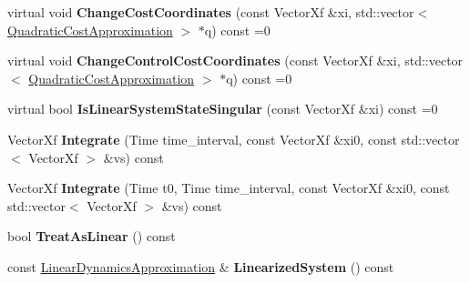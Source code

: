 \begin{DoxyCompactItemize}
\item 
virtual void {\bfseries Change\+Cost\+Coordinates} (const Vector\+Xf \&xi, std\+::vector$<$ \hyperlink{structilqgames_1_1_quadratic_cost_approximation}{Quadratic\+Cost\+Approximation} $>$ $\ast$q) const =0\hypertarget{classilqgames_1_1_multi_player_flat_system_a25f774ea87c09b634ee2ab9254c847a2}{}\label{classilqgames_1_1_multi_player_flat_system_a25f774ea87c09b634ee2ab9254c847a2}

\item 
virtual void {\bfseries Change\+Control\+Cost\+Coordinates} (const Vector\+Xf \&xi, std\+::vector$<$ \hyperlink{structilqgames_1_1_quadratic_cost_approximation}{Quadratic\+Cost\+Approximation} $>$ $\ast$q) const =0\hypertarget{classilqgames_1_1_multi_player_flat_system_ac267c5a7404b415270ef296e202e9a69}{}\label{classilqgames_1_1_multi_player_flat_system_ac267c5a7404b415270ef296e202e9a69}

\item 
virtual bool {\bfseries Is\+Linear\+System\+State\+Singular} (const Vector\+Xf \&xi) const =0\hypertarget{classilqgames_1_1_multi_player_flat_system_ad6087e0a046965cafa165e0b91c522c6}{}\label{classilqgames_1_1_multi_player_flat_system_ad6087e0a046965cafa165e0b91c522c6}

\item 
Vector\+Xf {\bfseries Integrate} (Time time\+\_\+interval, const Vector\+Xf \&xi0, const std\+::vector$<$ Vector\+Xf $>$ \&vs) const \hypertarget{classilqgames_1_1_multi_player_flat_system_afb949d4a488fd42bc2e250d520ef3b1e}{}\label{classilqgames_1_1_multi_player_flat_system_afb949d4a488fd42bc2e250d520ef3b1e}

\item 
Vector\+Xf {\bfseries Integrate} (Time t0, Time time\+\_\+interval, const Vector\+Xf \&xi0, const std\+::vector$<$ Vector\+Xf $>$ \&vs) const \hypertarget{classilqgames_1_1_multi_player_flat_system_acfdf524322acc6a648bf8ace934a2786}{}\label{classilqgames_1_1_multi_player_flat_system_acfdf524322acc6a648bf8ace934a2786}

\item 
bool {\bfseries Treat\+As\+Linear} () const \hypertarget{classilqgames_1_1_multi_player_flat_system_aa84d9e22e6df454d1751eefa46db28c5}{}\label{classilqgames_1_1_multi_player_flat_system_aa84d9e22e6df454d1751eefa46db28c5}

\item 
const \hyperlink{structilqgames_1_1_linear_dynamics_approximation}{Linear\+Dynamics\+Approximation} \& {\bfseries Linearized\+System} () const \hypertarget{classilqgames_1_1_multi_player_flat_system_a7bfa1936fce9997d061c86ce37d874b6}{}\label{classilqgames_1_1_multi_player_flat_system_a7bfa1936fce9997d061c86ce37d874b6}


\end{DoxyCompactItemize}
